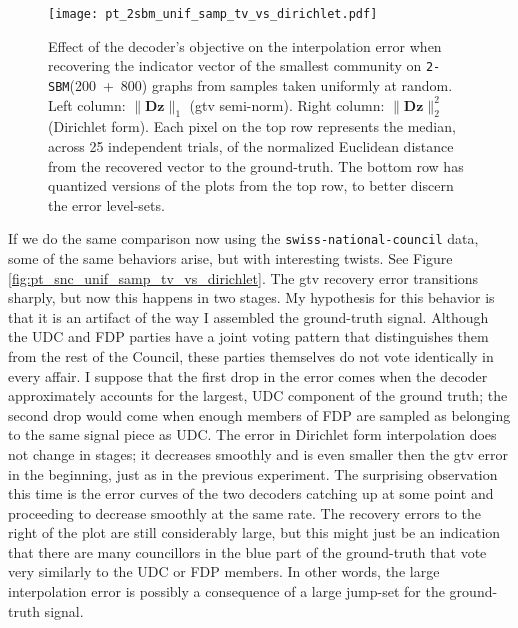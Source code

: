\begin{figure}[H]
    \centering
    \texttt{[image: pt\_2sbm\_unif\_samp\_tv\_vs\_dirichlet.pdf]}
    \caption[Decoder's objective and the interpolation error: \texttt{2-SBM}(200~+~800)]{Effect of the decoder's objective on the interpolation error when recovering the indicator vector of the smallest community on \texttt{2-SBM}(200~+~800) graphs from samples taken uniformly at random. Left column: $\|\mathbf{Dz}\|_1$ (\acrlong{gtv} semi-norm). Right column: $\|\mathbf{Dz}\|_2^2$ (Dirichlet form). Each pixel on the top row represents the median, across 25 independent trials, of the normalized Euclidean distance from the recovered vector to the ground-truth. The bottom row has quantized versions of the plots from the top row, to better discern the error level-sets.}
    \label{fig:pt_2sbm_unif_samp_tv_vs_dirichlet}
\end{figure}

If we do the same comparison now using the \texttt{swiss-national-council} data, some of the same behaviors arise, but with interesting twists. See Figure \ref{fig:pt_snc_unif_samp_tv_vs_dirichlet}. The \acrshort{gtv} recovery error transitions sharply, but now this happens in two stages. My hypothesis for this behavior is that it is an artifact of the way I assembled the ground-truth signal. Although the UDC and FDP parties have a joint voting pattern that distinguishes them from the rest of the Council, these parties themselves do not vote identically in every affair. I suppose that the first drop in the error comes when the decoder approximately accounts for the largest, UDC component of the ground truth; the second drop would come when enough members of FDP are sampled as belonging to the same signal piece as UDC. The error in Dirichlet form interpolation does not change in stages; it decreases smoothly and is even smaller then the \acrshort{gtv} error in the beginning, just as in the previous experiment. The surprising observation this time is the error curves of the two decoders catching up at some point and proceeding to decrease smoothly at the same rate. The recovery errors to the right of the plot are still considerably large, but this might just be an indication that there are many councillors in the blue part of the ground-truth that vote very similarly to the UDC or FDP members. In other words, the large interpolation error is possibly a consequence of a large jump-set for the ground-truth signal.

